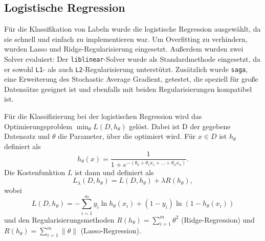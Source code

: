 \subsection{Logistische Regression}
\label{sec:logreg}

Für die Klassifikation von Labeln wurde die logistische Regression ausgewählt, da sie schnell und einfach zu implementieren war. Um Overfitting zu verhindern, wurden Lasso und Ridge-Regularisierung eingesetzt. Außerdem wurden zwei Solver evaluiert: Der \texttt{liblinear}-Solver wurde als Standardmethode eingesetzt, da er sowohl \texttt{L1}- als auch \texttt{L2}-Regularisierung unterstützt. Zusätzlich wurde \texttt{saga}, eine Erweiterung des Stochastic Average Gradient, getestet, die speziell für große Datensätze geeignet ist und ebenfalls mit beiden Regularisierungen kompatibel ist.

Für die Klassifizierung bei der logistischen Regression wird das Optimierungsproblem $\min_\theta L(D,h_\theta)$ gelöst. Dabei ist D der gegebene Datensatz und $\theta$ die Parameter, über die optimiert wird. Für $x \in D$ ist $h_\theta$ definiert als
\begin{equation*}
    h_\theta(x) = \frac{1}{1 + e^{-(\theta_0 + \theta_1 x_1 + \dots + \theta_n x_n)}}.
\end{equation*}
Die Kostenfunktion $L$ ist dann und definiert als
\begin{equation*}
    L_\lambda(D, h_\theta)=L(D,h_\theta)+\lambda R(h_\theta),
\end{equation*}
wobei
\begin{equation*}
    L(D,h_\theta)=- \sum_{i=1}^{m}  y_i \ln h_\theta(x_i) + (1 - y_i) \ln (1 - h_\theta(x_i))
\end{equation*}
und den Regularisierungsmethoden $R(h_\theta)=\sum_{i=1}^m\theta^2$ (Ridge-Regression) und $ R(h_\theta)=\sum_{i=1}^m\|\theta\|$ (Lasso-Regression).
